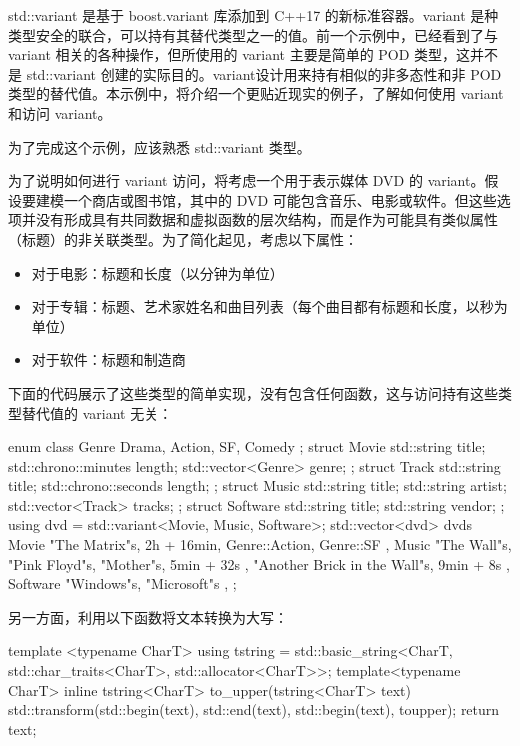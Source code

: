 
std::variant 是基于 boost.variant 库添加到 C++17 的新标准容器。variant 是种类型安全的联合，可以持有其替代类型之一的值。前一个示例中，已经看到了与 variant 相关的各种操作，但所使用的 variant 主要是简单的 POD 类型，这并不是 std::variant 创建的实际目的。variant设计用来持有相似的非多态性和非 POD 类型的替代值。本示例中，将介绍一个更贴近现实的例子，了解如何使用 variant 和访问 variant。


为了完成这个示例，应该熟悉 std::variant 类型。

为了说明如何进行 variant 访问，将考虑一个用于表示媒体 DVD 的 variant。假设要建模一个商店或图书馆，其中的 DVD 可能包含音乐、电影或软件。但这些选项并没有形成具有共同数据和虚拟函数的层次结构，而是作为可能具有类似属性（标题）的非关联类型。为了简化起见，考虑以下属性：

\begin{itemize}
\item
对于电影：标题和长度（以分钟为单位）

\item
对于专辑：标题、艺术家姓名和曲目列表（每个曲目都有标题和长度，以秒为单位）

\item
对于软件：标题和制造商
\end{itemize}

下面的代码展示了这些类型的简单实现，没有包含任何函数，这与访问持有这些类型替代值的 variant 无关：

\begin{cpp}
enum class Genre { Drama, Action, SF, Comedy };
struct Movie
{
    std::string title;
    std::chrono::minutes length;
    std::vector<Genre> genre;
};
struct Track
{
    std::string title;
    std::chrono::seconds length;
};
struct Music
{
    std::string title;
    std::string artist;
    std::vector<Track> tracks;
};
struct Software
{
    std::string title;
    std::string vendor;
};
using dvd = std::variant<Movie, Music, Software>;
std::vector<dvd> dvds
{
    Movie{ "The Matrix"s, 2h + 16min,{ Genre::Action, Genre::SF } },
    Music{ "The Wall"s, "Pink Floyd"s,
        { { "Mother"s, 5min + 32s },
            { "Another Brick in the Wall"s, 9min + 8s } } },
    Software{ "Windows"s, "Microsoft"s },
};
\end{cpp}

另一方面，利用以下函数将文本转换为大写：

\begin{cpp}
template <typename CharT>
using tstring = std::basic_string<CharT, std::char_traits<CharT>,
                                         std::allocator<CharT>>;
template<typename CharT>
inline tstring<CharT> to_upper(tstring<CharT> text)
{
    std::transform(std::begin(text), std::end(text),
                   std::begin(text), toupper);
    return text;
}
\end{cpp}

